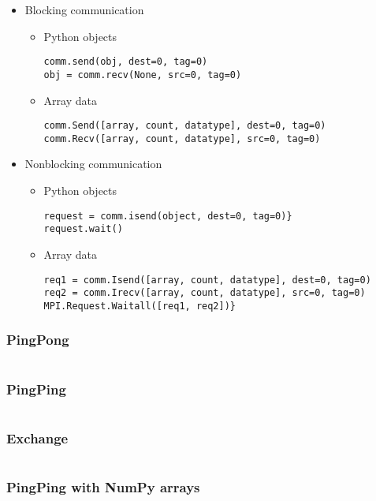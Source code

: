 \begin{frame}[fragile]
  \begin{itemize}
  \item Blocking communication
    \begin{itemize}
    \item Python objects
      {\footnotesize
\begin{verbatim}
comm.send(obj, dest=0, tag=0)
obj = comm.recv(None, src=0, tag=0)
\end{verbatim}
      }
    \item Array data
      {\footnotesize
\begin{verbatim}
comm.Send([array, count, datatype], dest=0, tag=0)
comm.Recv([array, count, datatype], src=0, tag=0)
\end{verbatim}
      }
    \end{itemize}
  \item Nonblocking communication
    \begin{itemize}
    \item Python objects
      {\footnotesize
\begin{verbatim}
request = comm.isend(object, dest=0, tag=0)}
request.wait()
\end{verbatim}
      }
    \item Array data
      {\footnotesize
\begin{verbatim}
req1 = comm.Isend([array, count, datatype], dest=0, tag=0)
req2 = comm.Irecv([array, count, datatype], src=0, tag=0)
MPI.Request.Waitall([req1, req2])}
\end{verbatim}
      }
    \end{itemize}
  \end{itemize}
\end{frame}

\begin{frame}
  \frametitle{PingPong}
  \inputminted[linenos]{python}{p2p_pingpong.py}
\end{frame}

\begin{frame}
  \frametitle{PingPing}
  \inputminted[linenos]{python}{p2p_pingping.py}
\end{frame}

\begin{frame}
  \frametitle{Exchange}
  \inputminted[linenos]{python}{p2p_exchange.py}
\end{frame}

\begin{frame}
  \frametitle{PingPing with NumPy arrays}
  \inputminted[linenos]{python}{p2p_pingping-numpy.py}
\end{frame}

